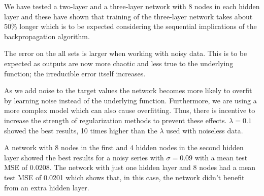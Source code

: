 \documentclass[a4paper]{article}
\begin{document}
We have tested a two-layer and a three-layer network with 8 nodes in each hidden layer and these have shown that training of the three-layer network takes about 50\% longer which is to be expected considering the sequential implications of the backpropagation algorithm.

The error on the all sets is larger when working with noisy data. This is to be expected as outputs are now more chaotic and less true to the underlying function; the irreducible error itself increases.


As we add noise to the target values the network becomes more likely to overfit by learning noise instead of the underlying function. Furthermore, we are using a more complex model which can also cause overfitting. Thus, there is incentive to increase the strength of regularization methods to prevent these effects. $\lambda = 0.1$ showed the best results, 10 times higher than the $\lambda$ used with noiseless data. %


A network with 8 nodes in the first and 4 hidden nodes in the second hidden layer showed the best results for a noisy series with $\sigma = 0.09$ with a mean test MSE of 0.0208. The network with just one hidden layer and 8 nodes had a mean test MSE of 0.0201 which shows that, in this case, the network didn't benefit from an extra hidden layer.
\end{document}
